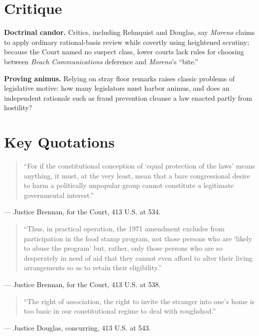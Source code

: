 \documentclass[12pt]{article}
\begin{document}
\section{Critique}

\textbf{Doctrinal candor.} Critics, including Rehnquist and Douglas, say \textit{Moreno} claims to apply ordinary rational-basis review while covertly using heightened scrutiny; because the Court named no suspect class, lower courts lack rules for choosing between \textit{Beach Communications} deference and \textit{Moreno}'s ``bite.''

\textbf{Proving animus.} Relying on stray floor remarks raises classic problems of legislative motive: how many legislators must harbor animus, and does an independent rationale such as fraud prevention cleanse a law enacted partly from hostility?

\section{Key Quotations}

\begin{quote}
``For if the constitutional conception of `equal protection of the laws' means anything, it must, at the very least, mean that a bare congressional desire to harm a politically unpopular group cannot constitute a legitimate governmental interest.''
\end{quote}
\noindent --- Justice Brennan, for the Court, 413 U.S. at 534.

\begin{quote}
``Thus, in practical operation, the 1971 amendment excludes from participation in the food stamp program, not those persons who are `likely to abuse the program' but, rather, only those persons who are so desperately in need of aid that they cannot even afford to alter their living arrangements so as to retain their eligibility.''
\end{quote}
\noindent --- Justice Brennan, for the Court, 413 U.S. at 538.

\begin{quote}
``The right of association, the right to invite the stranger into one's home is too basic in our constitutional regime to deal with roughshod.''
\end{quote}
\noindent --- Justice Douglas, concurring, 413 U.S. at 543.
\end{document}
